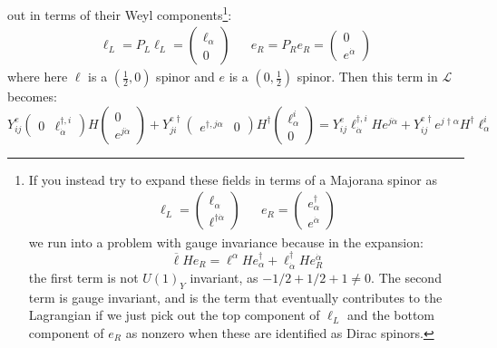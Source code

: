 \documentclass[11pt, oneside]{article}   	%
\theoremstyle{definition}
\numberwithin{equation}{subsection}		%
\begin{document}
\begin{enumerate}
	out in terms of their Weyl components\footnote{If you instead try to expand these fields in terms of a Majorana spinor as 
	\begin{align}
		\ell_L = \begin{pmatrix} \ell_\alpha \\ \ell^{\dagger\dot\alpha} \end{pmatrix} && e_R = \begin{pmatrix} e^{\dagger}_\alpha \\ e^{\dot 
		\alpha} \end{pmatrix}
	\end{align}
	we run into a problem with gauge invariance because in the expansion:
	\begin{equation}
		\overline\ell H e_R = \ell^\alpha H e^\dagger_\alpha + \ell^\dagger_{\dot \alpha} H e_R^{\dot \alpha}
	\end{equation}
	the first term is not $U(1)_Y$ invariant, as $-1/2 + 1/2 + 1\neq 0$. The second term is gauge invariant, and is the term that eventually 
	contributes to the Lagrangian if we just pick out the top component of $\ell_L$ and the bottom component of $e_R$ as nonzero when 
	these are identified as Dirac spinors.
	}:
	\begin{align}
		\ell_L = P_L\ell_L = \begin{pmatrix} \ell_\alpha \\ 0 \end{pmatrix} && e_R = P_R e_R = \begin{pmatrix} 0 \\ e^{\dot \alpha} 
	\end{pmatrix}
	\end{align}
	where here $\ell$ is a $(\frac{1}{2}, 0)$ spinor and $e$ is a $(0, \frac{1}{2})$ spinor. Then this term in $\mathcal L$ becomes:
	\begin{equation}
		Y_{ij}^e \begin{pmatrix} 0 & \ell^{\dagger, i}_{\dot \alpha} \end{pmatrix} H \begin{pmatrix} 0 \\ e^{j\dot \alpha}\end{pmatrix} 
		+ Y_{ji}^{e\dagger} \begin{pmatrix} e^{\dagger, j\alpha} & 0 \end{pmatrix} H^\dagger \begin{pmatrix} \ell_\alpha^i \\ 0 \end{pmatrix} 
		= Y_{ij}^e \ell^{\dagger, i}_{\dot \alpha} H e^{j\dot \alpha} + Y_{ij}^{e\dagger} e^{j\dagger \alpha} H^\dagger \ell_\alpha^i

\end{equation}
\end{enumerate}
\end{document}
